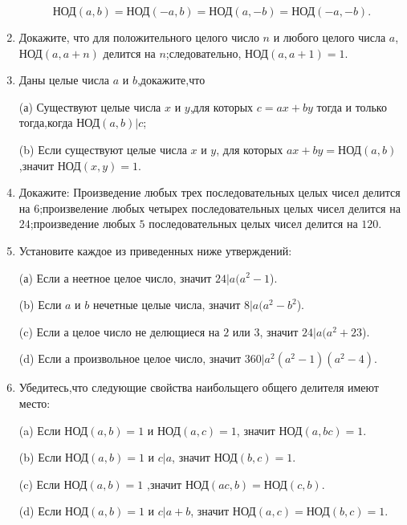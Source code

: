 \documentclass[11pt]{article}
\begin{document}
\begin{enumerate}
	\[\text{НОД}(a,b)=\text{НОД}(-a,b)=\text{НОД}(a,-b)=\text{НОД}(-a,-b).\]


\item Докажите, что для положительного целого число $n$ и любого целого числа $a$, $\text{НОД}(a,a+n)$ делится на $n$;следовательно, $\text{НОД}(a,a+1)=1$.

\item Даны целые числа $a$ и $b$,докажите,что
\begin{enumerate}
	(а) Существуют целые числа $x$ и $y$,для которых $c=ax+by$ тогда и только тогда,когда $\text{НОД}(a,b)|c$;
\end{enumerate}
\begin{enumerate}
	(b) Если существуют целые числа $x$ и $y$, для которых $ax+by=\text{НОД}(a,b)$,значит $\text{НОД}(x,y)=1$.
\end{enumerate}
\item Докажите: Произведение любых трех последовательных целых чисел делится на $6$;произвеление любых четырех последовательных целых чисел делится на $24$;произведение любых $5$ последовательных целых чисел делится на $120$.
\item Установите каждое из приведенных ниже утверждений:
\begin{enumerate}
	(а) Если а неетное целое число, значит $24|a(a^{2}-1$).
\end{enumerate}
\begin{enumerate}
	(b) Если $a$ и $b$ нечетные целые числа, значит $8|a(a^{2}-b^{2}$).
\end{enumerate}
\begin{enumerate}
	(c) Если $а$ целое число не делющиеся на $2$ или $3$, значит $24|a(a^{2}+23$).
\end{enumerate}
\begin{enumerate}
	(d) Если $а$ произвольное целое число, значит $360|a^{2}(a^{2}-1)(a^{2}-4)$.
\end{enumerate}

\item Убедитесь,что следующие свойства наибольщего общего делителя имеют место:
\begin{enumerate}
	(a) Если $\text{НОД}(a,b)=1$ и $\text{НОД}(a,c)=1$, значит $\text{НОД}(a,bc)=1$.
\end{enumerate}
\begin{enumerate}
	(b) Если $\text{НОД}(a,b)=1$ и $c|a$, значит $\text{НОД}(b,c)=1$.
\end{enumerate}
\begin{enumerate}
	(c) Если $\text{НОД}(a,b)=1$ ,значит $\text{НОД}(ac,b)=\text{НОД}(c,b)$.
\end{enumerate}
\begin{enumerate}
	(d) Если $\text{НОД}(a,b)=1$ и $c|a+b$, значит $\text{НОД}(a,c)=\text{НОД}(b,c)=1$.
\end{enumerate}

\end{enumerate}
\end{document}
